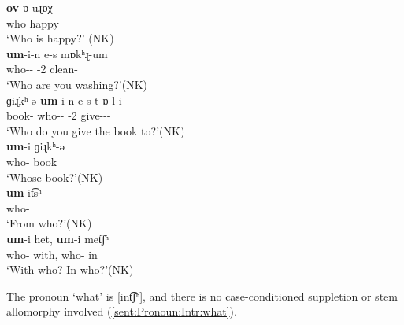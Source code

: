 \begin{exe}
	\ex \label{sent:Pronoun:Intr:who}
	\begin{xlist}
		\ex \gll \textbf{ov} ɒ uɻɒχ \\
		who  {\auxgloss} happy \\
		\trans `Who is happy?'\label{ex:wh word: who: nom} \hfill (NK)\\ 
		\ex \gll \textbf{um}-i-n e-s mɒkʰɻ-um \\
		who-{\dat}-{} {\auxgloss}-2{\sg} clean-{\impfcvb} \\
		\trans `Who are you washing?'\hfill (NK)
		\\ 
		\ex \gll ɡiɻkʰ-ə \textbf{um}-i-n e-s t-ɒ-l-i \\
		book-{} who-{\dat}-{} {\auxgloss}-2{\sg} give-{\thgloss}-{\infgloss}-{\impfcvb} \\
		\trans `Who do you give the book to?'\hfill (NK)
		\\ 
		\ex \gll \textbf{um}-i ɡiɻkʰ-ə \\
		who-{\gen} book{} \\
		\trans `Whose book?'\hfill (NK)
		\\ 
		\ex \gll \textbf{um}-it͡sʰ \\
		who-{\abl} \\
		\trans `From who?'\hfill (NK)
		\\ 
		\ex \gll \textbf{um}-i het, \textbf{um}-i met͡ʃʰ \\
		who-{\gen} with, who-{\gen} in \\
		\trans `With who? In who?'\hfill (NK)
		\\ 
	\end{xlist}
\end{exe}

The pronoun `what' is [int͡ʃʰ], and there is no case-conditioned suppletion or stem allomorphy involved (\ref{sent:Pronoun:Intr:what}). 

